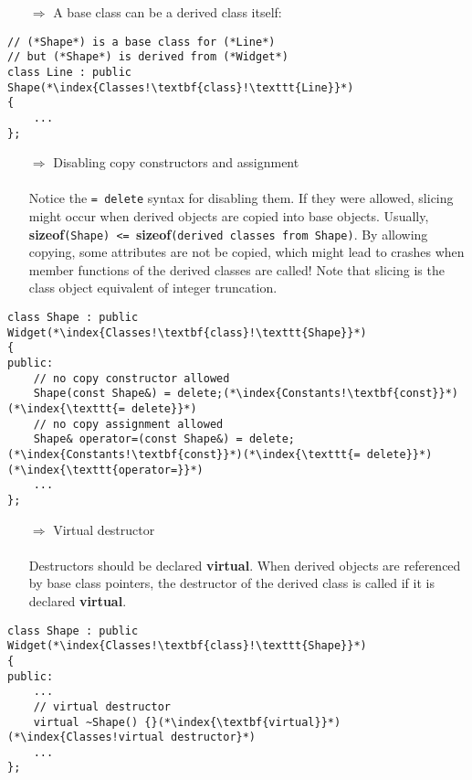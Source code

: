 \documentclass[10pt]{article}
\begin{document}
\begin{enumerate}
\item[$\Rightarrow$] A base class can be a derived class itself:
\end{enumerate}
\begin{lstlisting}
// (*Shape*) is a base class for (*Line*)
// but (*Shape*) is derived from (*Widget*)
class Line : public Shape(*\index{Classes!\textbf{class}!\texttt{Line}}*)
{
    ...
};
\end{lstlisting}
\begin{enumerate}
\item[$\Rightarrow$] Disabling copy constructors and assignment\\ \\ Notice the \texttt{= delete} syntax for disabling them. If they were allowed, slicing might occur when derived objects are copied into base objects. Usually, \textbf{sizeof}\texttt{(Shape) <= }\textbf{sizeof}\texttt{(derived classes from Shape)}. By allowing copying, some attributes are not be copied, which might lead to crashes when member functions of the derived classes are called! Note that slicing is the class object equivalent of integer truncation.
\end{enumerate}
\begin{lstlisting}
class Shape : public Widget(*\index{Classes!\textbf{class}!\texttt{Shape}}*)
{
public:
    // no copy constructor allowed
    Shape(const Shape&) = delete;(*\index{Constants!\textbf{const}}*)(*\index{\texttt{= delete}}*)
    // no copy assignment allowed
    Shape& operator=(const Shape&) = delete;(*\index{Constants!\textbf{const}}*)(*\index{\texttt{= delete}}*)(*\index{\texttt{operator=}}*)
    ...
};
\end{lstlisting}
\begin{enumerate}
\item[$\Rightarrow$] Virtual destructor\\ \\ Destructors should be declared \textbf{virtual}. When derived
objects are referenced by base class pointers, the destructor of the derived class is called if it is declared \textbf{virtual}.
\end{enumerate}
\begin{lstlisting}
class Shape : public Widget(*\index{Classes!\textbf{class}!\texttt{Shape}}*)
{
public:
    ...
    // virtual destructor
    virtual ~Shape() {}(*\index{\textbf{virtual}}*)(*\index{Classes!virtual destructor}*)
    ...
};
\end{lstlisting}
\end{document}
